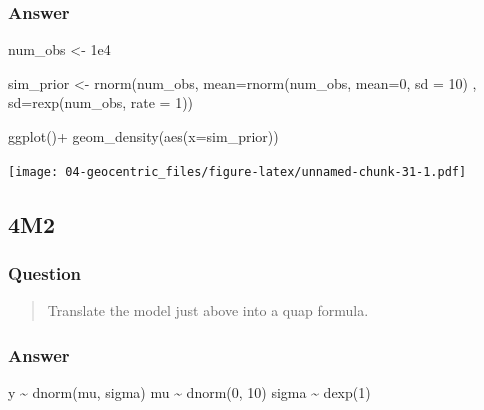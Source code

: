 \documentclass[
]{book}
\newenvironment{Shaded}{\begin{snugshade}}{\end{snugshade}}
\newcommand{\AttributeTok}[1]{\textcolor[rgb]{0.77,0.63,0.00}{#1}}
\newcommand{\DecValTok}[1]{\textcolor[rgb]{0.00,0.00,0.81}{#1}}
\newcommand{\FloatTok}[1]{\textcolor[rgb]{0.00,0.00,0.81}{#1}}
\newcommand{\FunctionTok}[1]{\textcolor[rgb]{0.00,0.00,0.00}{#1}}
\newcommand{\NormalTok}[1]{#1}
\newcommand{\OtherTok}[1]{\textcolor[rgb]{0.56,0.35,0.01}{#1}}
\newcommand{\SpecialCharTok}[1]{\textcolor[rgb]{0.00,0.00,0.00}{#1}}
\begin{document}
\hypertarget{answer-38}{%
\subsubsection*{Answer}\label{answer-38}}

\begin{Shaded}
\begin{Highlighting}[]
\NormalTok{num\_obs }\OtherTok{\textless{}{-}} \FloatTok{1e4}

\NormalTok{sim\_prior }\OtherTok{\textless{}{-}} \FunctionTok{rnorm}\NormalTok{(num\_obs,}
                   \AttributeTok{mean=}\FunctionTok{rnorm}\NormalTok{(num\_obs, }\AttributeTok{mean=}\DecValTok{0}\NormalTok{, }\AttributeTok{sd =} \DecValTok{10}\NormalTok{) , }
                   \AttributeTok{sd=}\FunctionTok{rexp}\NormalTok{(num\_obs, }\AttributeTok{rate =} \DecValTok{1}\NormalTok{))}

\FunctionTok{ggplot}\NormalTok{()}\SpecialCharTok{+}
  \FunctionTok{geom\_density}\NormalTok{(}\FunctionTok{aes}\NormalTok{(}\AttributeTok{x=}\NormalTok{sim\_prior))}
\end{Highlighting}
\end{Shaded}

\texttt{[image: 04-geocentric\_files/figure-latex/unnamed-chunk-31-1.pdf]}

\hypertarget{m2-2}{%
\subsection*{4M2}\label{m2-2}}

\hypertarget{question-39}{%
\subsubsection*{Question}\label{question-39}}

\begin{quote}
Translate the model just above into a quap formula.
\end{quote}

\hypertarget{answer-39}{%
\subsubsection*{Answer}\label{answer-39}}

y \textasciitilde{} dnorm(mu, sigma)
mu \textasciitilde{} dnorm(0, 10)
sigma \textasciitilde{} dexp(1)
\end{document}
